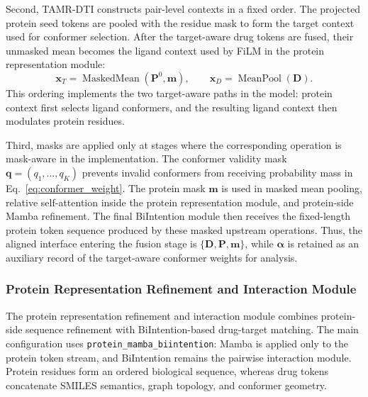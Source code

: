 Second, TAMR-DTI constructs pair-level contexts in a fixed order. The projected
protein seed tokens are pooled with the residue mask to form the target context
used for conformer selection. After the target-aware drug tokens are fused, their
unmasked mean becomes the ligand context used by FiLM in the protein
representation module:
\begin{equation}
  \mathbf{x}_T =
  \operatorname{MaskedMean}(\mathbf{P}^{0},\mathbf{m}),
  \qquad
  \mathbf{x}_D =
  \operatorname{MeanPool}(\mathbf{D}).
  \label{eq:feature_contexts}
\end{equation}
This ordering implements the two target-aware paths in the model: protein
context first selects ligand conformers, and the resulting ligand context then
modulates protein residues.

Third, masks are applied only at stages where the corresponding operation is
mask-aware in the implementation. The conformer validity mask
$\mathbf{q}=(q_1,\ldots,q_K)$ prevents invalid conformers from receiving
probability mass in Eq.~\ref{eq:conformer_weight}. The protein mask
$\mathbf{m}$ is used in masked mean pooling, relative self-attention inside the
protein representation module, and protein-side Mamba refinement. The final BiIntention module
then receives the fixed-length protein token sequence produced by these masked
upstream operations. Thus, the aligned interface entering the fusion stage is
$\{\mathbf{D},\mathbf{P},\mathbf{m}\}$, while
$\boldsymbol{\alpha}$ is retained as an auxiliary record of the target-aware
conformer weights for analysis.

\subsubsection{Protein Representation Refinement and Interaction Module}
\label{sec:feature_fusion_module}

The protein representation refinement and interaction module combines
protein-side sequence refinement with BiIntention-based drug-target matching.
The main configuration uses
\texttt{protein\_mamba\_biintention}: Mamba is applied only to the protein token
stream, and BiIntention remains the pairwise interaction module. Protein
residues form an ordered biological sequence, whereas drug tokens concatenate
SMILES semantics, graph topology, and conformer geometry.


